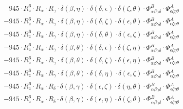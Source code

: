 \documentclass{article}
\begin{document}
\begin{equation}
\begin{array}{c}
 \\[0.2em] 		 - 945 \cdot R_{z}^{6} \cdot R_{\alpha{}} \cdot R_{\gamma{}} \cdot \delta{}\left(\beta{}, \eta{}\right) \cdot \delta{}\left(\delta{}, \epsilon{}\right) \cdot \delta{}\left(\zeta{}, \theta{}\right) \cdot \Phi{}^{B}_{\alpha{}\beta{}\gamma{}\delta{}} \cdot \Phi{}^{A}_{\epsilon{}\zeta{}\eta{}\theta{}} 
 \\[0.2em] 		 - 945 \cdot R_{z}^{6} \cdot R_{\alpha{}} \cdot R_{\gamma{}} \cdot \delta{}\left(\beta{}, \eta{}\right) \cdot \delta{}\left(\delta{}, \zeta{}\right) \cdot \delta{}\left(\epsilon{}, \theta{}\right) \cdot \Phi{}^{B}_{\alpha{}\beta{}\gamma{}\delta{}} \cdot \Phi{}^{A}_{\epsilon{}\zeta{}\eta{}\theta{}} 
 \\[0.2em] 		 - 945 \cdot R_{z}^{6} \cdot R_{\alpha{}} \cdot R_{\gamma{}} \cdot \delta{}\left(\beta{}, \eta{}\right) \cdot \delta{}\left(\delta{}, \theta{}\right) \cdot \delta{}\left(\epsilon{}, \zeta{}\right) \cdot \Phi{}^{B}_{\alpha{}\beta{}\gamma{}\delta{}} \cdot \Phi{}^{A}_{\epsilon{}\zeta{}\eta{}\theta{}} 
 \\[0.2em] 		 - 945 \cdot R_{z}^{6} \cdot R_{\alpha{}} \cdot R_{\gamma{}} \cdot \delta{}\left(\beta{}, \theta{}\right) \cdot \delta{}\left(\delta{}, \epsilon{}\right) \cdot \delta{}\left(\zeta{}, \eta{}\right) \cdot \Phi{}^{B}_{\alpha{}\beta{}\gamma{}\delta{}} \cdot \Phi{}^{A}_{\epsilon{}\zeta{}\eta{}\theta{}} 
 \\[0.2em] 		 - 945 \cdot R_{z}^{6} \cdot R_{\alpha{}} \cdot R_{\gamma{}} \cdot \delta{}\left(\beta{}, \theta{}\right) \cdot \delta{}\left(\delta{}, \zeta{}\right) \cdot \delta{}\left(\epsilon{}, \eta{}\right) \cdot \Phi{}^{B}_{\alpha{}\beta{}\gamma{}\delta{}} \cdot \Phi{}^{A}_{\epsilon{}\zeta{}\eta{}\theta{}} 
 \\[0.2em] 		 - 945 \cdot R_{z}^{6} \cdot R_{\alpha{}} \cdot R_{\gamma{}} \cdot \delta{}\left(\beta{}, \theta{}\right) \cdot \delta{}\left(\delta{}, \eta{}\right) \cdot \delta{}\left(\epsilon{}, \zeta{}\right) \cdot \Phi{}^{B}_{\alpha{}\beta{}\gamma{}\delta{}} \cdot \Phi{}^{A}_{\epsilon{}\zeta{}\eta{}\theta{}} 
 \\[0.2em] 		 - 945 \cdot R_{z}^{6} \cdot R_{\alpha{}} \cdot R_{\delta{}} \cdot \delta{}\left(\beta{}, \gamma{}\right) \cdot \delta{}\left(\epsilon{}, \zeta{}\right) \cdot \delta{}\left(\eta{}, \theta{}\right) \cdot \Phi{}^{B}_{\alpha{}\beta{}\gamma{}\delta{}} \cdot \Phi{}^{A}_{\epsilon{}\zeta{}\eta{}\theta{}} 
 \\[0.2em] 		 - 945 \cdot R_{z}^{6} \cdot R_{\alpha{}} \cdot R_{\delta{}} \cdot \delta{}\left(\beta{}, \gamma{}\right) \cdot \delta{}\left(\epsilon{}, \eta{}\right) \cdot \delta{}\left(\zeta{}, \theta{}\right) \cdot \Phi{}^{B}_{\alpha{}\beta{}\gamma{}\delta{}} \cdot \Phi{}^{A}_{\epsilon{}\zeta{}\eta{}\theta{}} 

\end{array}
\end{equation}
\end{document}
